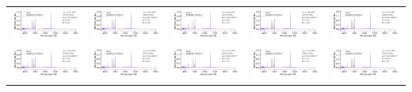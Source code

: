 \begin{center}
\begin{longtable}{l l l l l }
    \includegraphics[width=0.19\linewidth, clip]{model_170000_36.43_3.18.pdf} & \includegraphics[width=0.19\linewidth, clip]{model_140000_37.22_3.74.pdf} & \includegraphics[width=0.19\linewidth, clip]{model_140000_37.15_3.70.pdf} & \includegraphics[width=0.19\linewidth, clip]{model_160000_36.86_3.54.pdf} & \includegraphics[width=0.19\linewidth, clip]{model_120000_37.39_3.78.pdf} \\
    \includegraphics[width=0.19\linewidth, clip]{model_140000_36.79_3.40.pdf} & \includegraphics[width=0.19\linewidth, clip]{model_130000_36.93_3.48.pdf} & \includegraphics[width=0.19\linewidth, clip]{model_120000_37.41_3.78.pdf} & \includegraphics[width=0.19\linewidth, clip]{model_130000_37.27_3.74.pdf} & \includegraphics[width=0.19\linewidth, clip]{model_170000_36.58_3.30.pdf} \\

\end{longtable}
\end{center}
